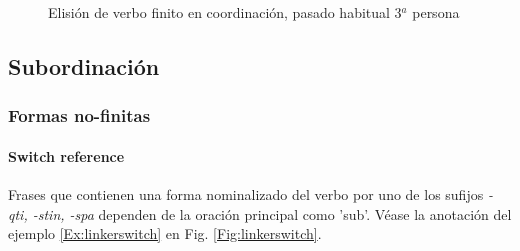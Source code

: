 \documentclass[a4paper,11pt,DIV12]{scrartcl}
\begin{document}
\begin{figure}
 \begin{center}
\end{center}
\caption{Elisi\'on de verbo finito en coordinaci\'on, pasado habitual 3$^a$ persona}\label{Fig:elision2}
\end{figure}

\subsection{Subordinaci\'on}

\subsubsection{Formas no-finitas}

\paragraph{Switch reference}

Frases que contienen una forma nominalizado del verbo por uno de los sufijos {\em  -qti, -stin, -spa} dependen de la oraci\'on principal como 'sub'. V\'ease la anotaci\'on del ejemplo \ref{Ex:linkerswitch} en Fig. \ref{Fig:linkerswitch}.
\end{document}
